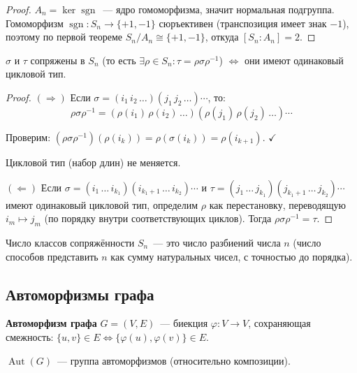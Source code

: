 \documentclass[12pt]{article}
\begin{document}
	\begin{proof}
		$A_n = \ker \operatorname{sgn}$~--- ядро гомоморфизма, значит нормальная подгруппа. Гомоморфизм $\operatorname{sgn}: S_n \to \{+1, -1\}$ сюръективен (транспозиция имеет знак $-1$), поэтому по первой теореме $S_n / A_n \cong \{+1, -1\}$, откуда $[S_n : A_n] = 2$.
	\end{proof}
	
	\begin{theorem}
		$\sigma$ и $\tau$ сопряжены в $S_n$ (то есть $\exists \rho \in S_n: \tau = \rho \sigma \rho^{-1}$) $\Leftrightarrow$ они имеют одинаковый цикловой тип.
	\end{theorem}
	
	\begin{proof}
		$(\Rightarrow)$ Если $\sigma = (i_1 \, i_2 \, \dots)(j_1 \, j_2 \, \dots)\cdots$, то:
		\[\rho \sigma \rho^{-1} = (\rho(i_1) \, \rho(i_2) \, \dots)(\rho(j_1) \, \rho(j_2) \, \dots)\cdots\]
		
		Проверим: $(\rho \sigma \rho^{-1})(\rho(i_k)) = \rho(\sigma(i_k)) = \rho(i_{k+1})$. $\checkmark$
		
		Цикловой тип (набор длин) не меняется.
		
		$(\Leftarrow)$ Если $\sigma = (i_1 \, \dots \, i_{k_1})(i_{k_1+1} \, \dots \, i_{k_2})\cdots$ и $\tau = (j_1 \, \dots \, j_{k_1})(j_{k_1+1} \, \dots \, j_{k_2})\cdots$ имеют одинаковый цикловой тип, определим $\rho$ как перестановку, переводящую $i_m \mapsto j_m$ (по порядку внутри соответствующих циклов). Тогда $\rho \sigma \rho^{-1} = \tau$.
	\end{proof}
	
	\begin{corollary}
		Число классов сопряжённости $S_n$~--- это число разбиений числа $n$ (число способов представить $n$ как сумму натуральных чисел, с точностью до порядка).
	\end{corollary}
	
	\subsection{Автоморфизмы графа}
	
	\begin{definition}
		\textbf{Автоморфизм графа} $G = (V, E)$~--- биекция $\varphi: V \to V$, сохраняющая смежность: $\{u, v\} \in E \Leftrightarrow \{\varphi(u), \varphi(v)\} \in E$.
		
		$\operatorname{Aut}(G)$~--- группа автоморфизмов (относительно композиции).
	\end{definition}
	
\end{document}
